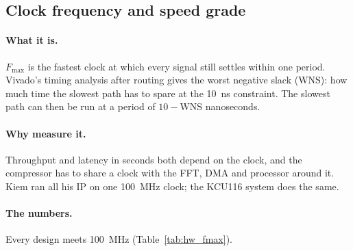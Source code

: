\subsection{Clock frequency and speed grade}
\label{sec:hw_fmax}

\paragraph{What it is.} $F_{\max}$ is the fastest clock at which every signal
still settles within one period. Vivado's timing analysis after routing gives
the worst negative slack (WNS): how much time the slowest path has to spare at
the \SI{10}{\nano\second} constraint. The slowest path can then be run at a
period of $10 - \mathrm{WNS}$ nanoseconds.

\paragraph{Why measure it.} Throughput and latency in seconds both depend on
the clock, and the compressor has to share a clock with the FFT, DMA and
processor around it. Kiem ran all his IP on one \SI{100}{\mega\hertz} clock;
the KCU116 system does the same.

\paragraph{The numbers.} Every design meets \SI{100}{\mega\hertz}
(Table~\ref{tab:hw_fmax}).

